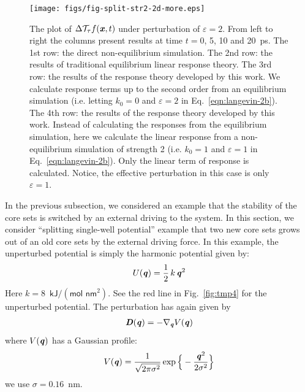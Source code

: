 \documentclass[aip,jcp,a4paper,reprint,onecolumn]{revtex4-1}
\newcommand{\vect}[1]{\textbf{\textit{#1}}}
\newcommand{\eps}{\varepsilon}
\newcommand{\mt}{\mathcal T}
\begin{document}

\begin{figure}
  \centering
  \texttt{[image: figs/fig-split-str2-2d-more.eps]}
  \caption{
    The plot of $\Delta\mt_\tau f(\vect x,t)$  under perturbation of
    $\eps = 2$. From left to right the
    columns present results at time $t = 0$, 5, 10 and
    20~\textsf{ps}.
    The 1st row: the direct non-equilibrium
    simulation. The 2nd row: the results of traditional equilibrium
    linear response theory.  The 3rd row: the results of the response
    theory developed by this work.  We calculate response terms up to
    the second order from an equilibrium simulation (i.e. letting $k_0
    = 0$ and $\eps = 2$ in Eq.~\eqref{eqn:langevin-2b}).
    The 4th row: the results of the response theory developed by this work.
    Instead of calculating the responses from the equilibrium simulation,
    here we calculate the linear response from a non-equilibrium simulation
    of strength 2 (i.e. $k_0 = 1$ and $\eps = 1$
    in Eq.~\eqref{eqn:langevin-2b}).
    Only the linear term of response is calculated.
    Notice, the effective perturbation in this case is only
    $\eps = 1$.
  }
  \label{fig:tmp6}
\end{figure}

In the previous subsection, we considered an example that the stability of the
core sets is switched by an external driving to the system.
In this section, we consider ``splitting single-well potential'' example
that two new core sets grows out of 
an old core sets by the external driving force.
In this example, the unperturbed
potential is simply the harmonic potential given by:
\begin{align}
  U(\vect q) = \frac12\,k\,\vect q^2 
\end{align}
Here $k = 8$~$\textsf{kJ} / (\textsf{mol nm}^2)$.
See the red line in Fig.~\ref{fig:tmp4} for the unperturbed potential.
The perturbation has again given by
\begin{align}
  \vect D(\vect q) = -\nabla_{\vect q} V(\vect q) 
\end{align}
where $V(\vect q)$ has a Gaussian profile:
\begin{align}
  V(\vect q) = \frac{1}{\sqrt{2\pi \sigma^2}}
  \exp\Big\{-\frac{\vect q^2}{2\sigma^2}\Big\}
\end{align}
we use $\sigma = 0.16$~\textsf{nm}.
\end{document}
